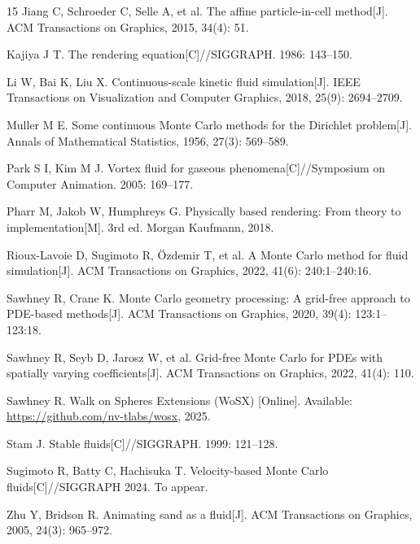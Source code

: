 \documentclass[UTF8,fontset=fandol]{ctexart}
\begin{document}
\begin{thebibliography}{15}
 Jiang C, Schroeder C, Selle A, et al. The affine particle-in-cell method[J]. ACM Transactions on Graphics, 2015, 34(4): 51.

 Kajiya J T. The rendering equation[C]//SIGGRAPH. 1986: 143--150.

 Li W, Bai K, Liu X. Continuous-scale kinetic fluid simulation[J]. IEEE Transactions on Visualization and Computer Graphics, 2018, 25(9): 2694--2709.

 Muller M E. Some continuous Monte Carlo methods for the Dirichlet problem[J]. Annals of Mathematical Statistics, 1956, 27(3): 569--589.

 Park S I, Kim M J. Vortex fluid for gaseous phenomena[C]//Symposium on Computer Animation. 2005: 169--177.

 Pharr M, Jakob W, Humphreys G. Physically based rendering: From theory to implementation[M]. 3rd ed. Morgan Kaufmann, 2018.

 Rioux-Lavoie D, Sugimoto R, {\"O}zdemir T, et al. A Monte Carlo method for fluid simulation[J]. ACM Transactions on Graphics, 2022, 41(6): 240:1--240:16.

 Sawhney R, Crane K. Monte Carlo geometry processing: A grid-free approach to PDE-based methods[J]. ACM Transactions on Graphics, 2020, 39(4): 123:1--123:18.

 Sawhney R, Seyb D, Jarosz W, et al. Grid-free Monte Carlo for PDEs with spatially varying coefficients[J]. ACM Transactions on Graphics, 2022, 41(4): 110.

 Sawhney R. Walk on Spheres Extensions (WoSX) [Online]. Available: \url{https://github.com/nv-tlabs/wosx}, 2025.

 Stam J. Stable fluids[C]//SIGGRAPH. 1999: 121--128.

 Sugimoto R, Batty C, Hachisuka T. Velocity-based Monte Carlo fluids[C]//SIGGRAPH 2024. To appear.

 Zhu Y, Bridson R. Animating sand as a fluid[J]. ACM Transactions on Graphics, 2005, 24(3): 965--972.

\end{thebibliography}
\end{document}
